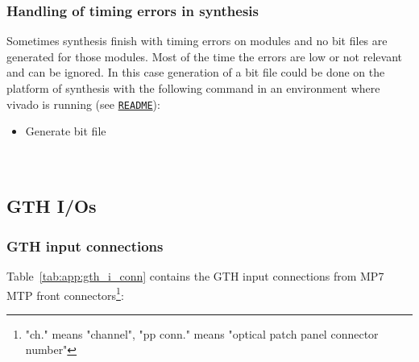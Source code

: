 \subsubsection{Handling of timing errors in synthesis}\label{sec:app:synth_timing_errors}

Sometimes synthesis finish with timing errors on modules and no bit files are generated for those modules.
Most of the time the errors are low or not relevant and can be ignored. In this case generation
of a bit file could be done on the platform of synthesis with the following command in an environment where
vivado is running (see \href{\gitbranch/README.md}{\texttt{README}}):\\
\begin{itemize}
\item Generate bit file\\
\\
\\
\end{itemize}

\subsection{GTH I/Os}\label{sec:app:gth_io}

\subsubsection{GTH input connections}\label{sec:app:gth_i_conn}

Table~\ref{tab:app:gth_i_conn} contains the GTH input connections from MP7 MTP front connectors\footnote{"ch." means "channel", "pp conn." means "optical patch panel connector number"}:

